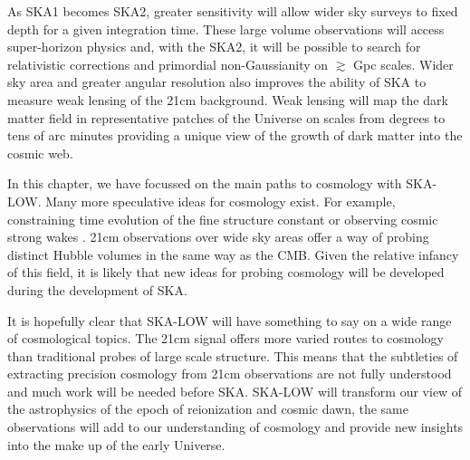 \documentclass{PoS}
\begin{document}
As SKA1 becomes SKA2, greater sensitivity will allow wider sky surveys to fixed depth for a given integration time. These large volume observations will access super-horizon physics and, with the SKA2, it will be possible to search for relativistic corrections and primordial non-Gaussianity on $\gtrsim$ Gpc scales. Wider sky area and greater angular resolution also improves the ability of SKA to measure weak lensing of the 21cm background. Weak lensing will map the dark matter field in representative patches of the Universe on scales from degrees to tens of arc minutes providing a unique view of the growth of dark matter into the cosmic web.

In this chapter, we have focussed on the main paths to cosmology with SKA-LOW. Many more speculative ideas for cosmology exist. For example, constraining time evolution of the fine structure constant \citep{2007PhRvL..98k1301K} or observing cosmic strong wakes \citep{2010JCAP...12..028B}. 21cm observations over wide sky areas offer a way of probing distinct Hubble volumes in the same way as the CMB. Given the relative infancy of this field, it is likely that new ideas for probing cosmology will be developed during the development of SKA.

It is hopefully clear that SKA-LOW will have something to say on a wide range of cosmological topics. The 21cm signal offers more varied routes to cosmology than traditional probes of large scale structure. This means that the subtleties of extracting precision cosmology from 21cm observations are not fully understood and much work will be needed before SKA. SKA-LOW will transform our view of the astrophysics of the epoch of reionization and cosmic dawn, the same observations will add to our understanding of cosmology and provide new insights into the make up of the early Universe.





\end{document}
